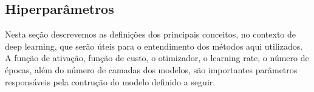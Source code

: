 





\subsection{Hiperparâmetros}
\label{sec:modelo-hp}

Nesta seção descrevemos as definições dos principais conceitos, no contexto de deep learning, que serão úteis para o entendimento dos métodos aqui utilizados. A função de ativação, função de custo, o otimizador, o learning rate, o número de épocas, além do número de camadas dos modelos, são importantes parâmetros responsáveis pela contrução do modelo definido a seguir.

